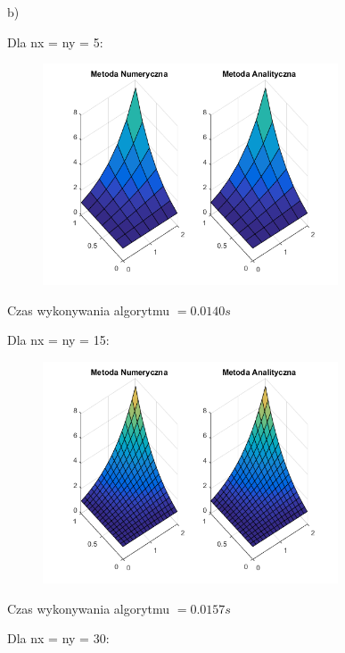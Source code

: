 b)

Dla nx = ny = 5:

\begin{figure}[!ht]
	\begin{center}
		\includegraphics[width=0.78\textwidth]{Lab5/charts/zad2/5x5.png}
	\end{center}
\end{figure}

Czas wykonywania algorytmu $ = 0.0140 s$

Dla nx = ny = 15:

\begin{figure}[!ht]
	\begin{center}
		\includegraphics[width=0.78\textwidth]{Lab5/charts/zad2/15x15.png}
	\end{center}
\end{figure}

Czas wykonywania algorytmu $ = 0.0157 s$

\newpage
Dla nx = ny = 30:

